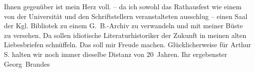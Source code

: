 \begin{ledgroupsized}[t]{13cm}
           \pstart
           Ihnen gegenüber ist mein Herz voll. \label{K_L02051_1v}\label{K_L02051_1h} – da ich sowohl das Rathausfest wie einem
                    von der Universität und den Schriftstellern veranstalteten ausschlug – einen
                    Saal der Kgl. Bibliotek zu einem G. B.-Archiv zu verwandeln und mit meiner Büste
                    zu versehen.\pend
           \pstart
           Da sollen idiotische Literaturhistoriker der Zukunft in meinen alten
                    Liebesbriefen schnüffeln. Das soll mir Freude machen.\pend
           \pstart
           Glücklicherweise für Arthur S. halten wir noch immer dieselbe Distanz von
                    20 Jahren.\pend
           \pstart Ihr ergebenster \spacefill\mbox{Georg Brandes}\pend{}
         
         \endnumbering{}\end{ledgroupsized}  \newcommand{\dateiname}{L02051}\newcommand{\titel}{Georg Brandes an Arthur und Olga Schnitzler, 3. 2. 1912}\newcommand{\editorInnen}{Martin Anton Müller und Gerd-Hermann Susen}
      